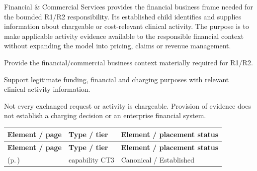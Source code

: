 Financial \& Commercial Services provides the financial business frame needed for the bounded R1/\allowbreak{}R2 responsibility. Its established child identifies and supplies information about chargeable or cost-relevant clinical activity. The purpose is to make applicable activity evidence available to the responsible financial context without expanding the model into pricing, claims or revenue management.



Provide the financial/\allowbreak{}commercial business context materially required for R1/\allowbreak{}R2.



Support legitimate funding, financial and charging purposes with relevant clinical-activity information.



Not every exchanged request or activity is chargeable. Provision of evidence does not establish a charging decision or an enterprise financial system.


\begingroup\small\setlength{\TableWidth}{\dimexpr\linewidth-6\tabcolsep-4\arrayrulewidth\relax}
\begin{longtable}{|>{\raggedright\arraybackslash}p{0.52\TableWidth}|>{\raggedright\arraybackslash}p{0.2\TableWidth}|>{\raggedright\arraybackslash}p{0.28\TableWidth}|}
\hline\rowcolor{TableHead}\textbf{Element / page} & \textbf{Type / tier} & \textbf{Element / placement status}\\\hline\endfirsthead
\hline\rowcolor{TableHead}\textbf{Element / page} & \textbf{Type / tier} & \textbf{Element / placement status}\\\hline\endhead
\hline\endfoot
\nameref{cap:bc-clinical-activity-charging-information-provision} (p.\,\pageref{cap:bc-clinical-activity-charging-information-provision}) & capability CT3 & Canonical / Established\\\hline
\end{longtable}\endgroup

